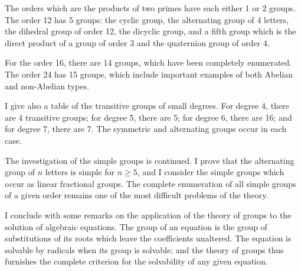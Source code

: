 \documentclass[11pt,a4paper]{book}
\begin{document}
The orders which are the products of two primes have each either 1 or 2 groups. The order 12 has 5 groups: the cyclic group, the alternating group of 4 letters, the dihedral group of order 12, the dicyclic group, and a fifth group which is the direct product of a group of order 3 and the quaternion group of order 4.

For the order 16, there are 14 groups, which have been completely enumerated. The order 24 has 15 groups, which include important examples of both Abelian and non-Abelian types.

I give also a table of the transitive groups of small degrees. For degree 4, there are 4 transitive groups; for degree 5, there are 5; for degree 6, there are 16; and for degree 7, there are 7. The symmetric and alternating groups occur in each case.

The investigation of the simple groups is continued. I prove that the alternating group of $n$ letters is simple for $n \ge 5$, and I consider the simple groups which occur as linear fractional groups. The complete enumeration of all simple groups of a given order remains one of the most difficult problems of the theory.

I conclude with some remarks on the application of the theory of groups to the solution of algebraic equations. The group of an equation is the group of substitutions of its roots which leave the coefficients unaltered. The equation is solvable by radicals when its group is solvable; and the theory of groups thus furnishes the complete criterion for the solvability of any given equation.
\clearpage
\end{document}
